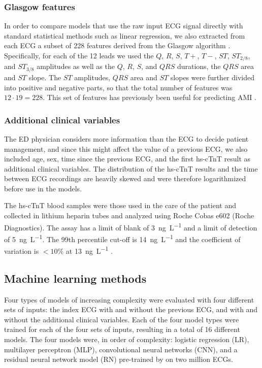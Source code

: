 \documentclass[preprint]{elsarticle}
\begin{document}
\subsubsection{Glasgow features}
\label{sec:glasgow}
In order to compare models that use the raw input ECG signal directly with standard statistical methods such as linear regression, we also extracted from each ECG a subset of 228 features derived from the Glasgow algorithm \citep{macfarlane2005}. Specifically, for each of the 12 leads we used the $Q$, $R$, $S$, $T+$, $T-$, $ST$, $ST_{2/8}$, and $ST_{3/8}$ amplitudes as well as the $Q$, $R$, $S$, and $QRS$ durations, the $QRS$ area and $ST$ slope. The $ST$ amplitudes, $QRS$ area and $ST$ slopes were further divided into positive and negative parts, so that the total number of features was $12 \cdot 19=228$. This set of features has previously been useful for predicting AMI \citep{forberg2009}.

\subsubsection{Additional clinical variables}
The ED physician considers more information than the ECG to decide patient management, and since this might affect the value of a previous ECG, we also included age, sex, time since the previous ECG, and the first hs-cTnT result as additional clinical variables. The distribution of the hs-cTnT results and the time between ECG recordings are heavily skewed and were therefore logarithmized before use in the models. 

The hs-cTnT blood samples were those used in the care of the patient and collected in lithium heparin tubes and analyzed using Roche Cobas e602 (Roche Diagnostics). The assay has a limit of blank of \SI{3}{\nano\gram\per\liter} and a limit of detection of \SI{5}{\nano\gram\per\liter}. The 99th percentile cut-off is \SI{14}{\nano\gram\per\liter} and the coefficient of variation is $<10\%$ at \SI{13}{\nano\gram\per\liter} \citep{giannitsis2010}.


\subsection{Machine learning methods}
Four types of models of increasing complexity were evaluated with four different sets of inputs: the index ECG with and without the previous ECG, and with and without the additional clinical variables. Each of the four model types were trained for each of the four sets of inputs, resulting in a total of 16 different models. The four models were, in order of complexity: logistic regression (LR), multilayer perceptron (MLP), convolutional neural networks (CNN), and a residual neural network model (RN) pre-trained by \citet{ribeiro2020} on two million ECGs.
\end{document}
